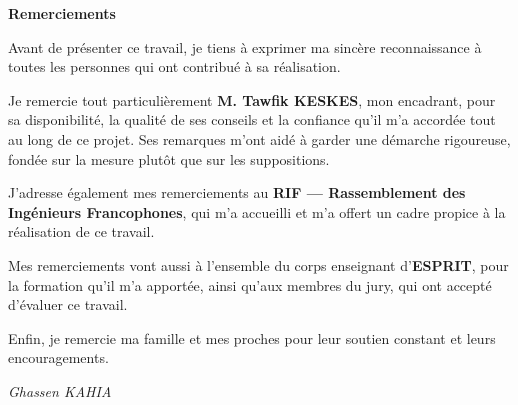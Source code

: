 \thispagestyle{empty}
\vspace*{2.5cm}
\begin{center}{\Huge\bfseries\color{bleu} Remerciements}\end{center}
\vspace{1.2cm}

Avant de présenter ce travail, je tiens à exprimer ma sincère reconnaissance à toutes les personnes
qui ont contribué à sa réalisation.

Je remercie tout particulièrement \textbf{M. Tawfik KESKES}, mon encadrant, pour sa disponibilité, la
qualité de ses conseils et la confiance qu'il m'a accordée tout au long de ce projet. Ses remarques
m'ont aidé à garder une démarche rigoureuse, fondée sur la mesure plutôt que sur les suppositions.

J'adresse également mes remerciements au \textbf{RIF --- Rassemblement des Ingénieurs Francophones}, qui
m'a accueilli et m'a offert un cadre propice à la réalisation de ce travail.

Mes remerciements vont aussi à l'ensemble du corps enseignant d'\textbf{ESPRIT}, pour la formation qu'il
m'a apportée, ainsi qu'aux membres du jury, qui ont accepté d'évaluer ce travail.

Enfin, je remercie ma famille et mes proches pour leur soutien constant et leurs encouragements.

\vfill
\begin{flushright}\textit{Ghassen KAHIA}\end{flushright}
\clearpage

\tableofcontents
\clearpage
\listoffigures
\clearpage
\listoftables
\clearpage
{}
